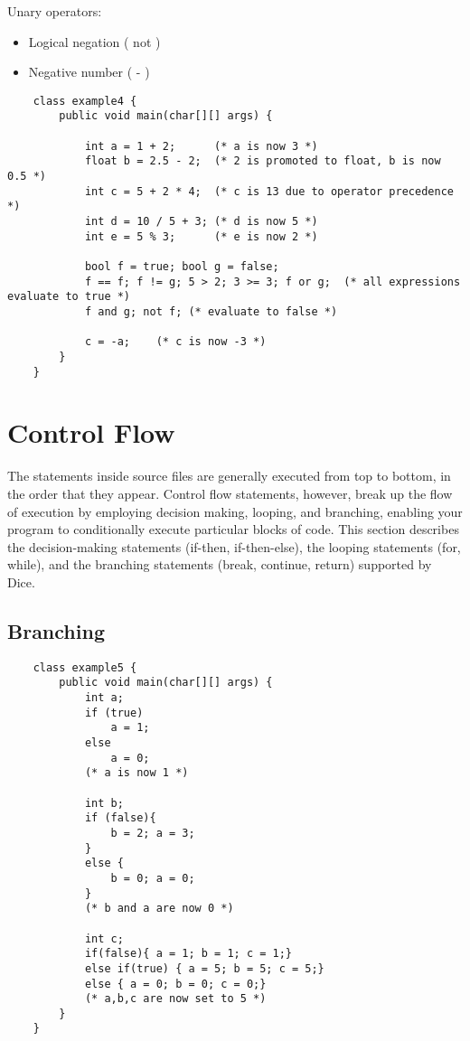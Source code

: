 \begin{homeworkProblem}
	Unary operators:
	\begin{itemize}
		\item Logical negation ( not )
		\item Negative number ( - )
	\end{itemize}

	\begin{verbatim}
	class example4 {
		public void main(char[][] args) {

			int a = 1 + 2;      (* a is now 3 *)
			float b = 2.5 - 2;  (* 2 is promoted to float, b is now 0.5 *)
			int c = 5 + 2 * 4;  (* c is 13 due to operator precedence *)
			int d = 10 / 5 + 3; (* d is now 5 *)
			int e = 5 % 3; 	    (* e is now 2 *)

			bool f = true; bool g = false; 
			f == f; f != g; 5 > 2; 3 >= 3; f or g;  (* all expressions evaluate to true *)
			f and g; not f; (* evaluate to false *)

			c = -a;    (* c is now -3 *)
		}
	}
	\end{verbatim}

	\section{Control Flow}
	The statements inside source files are generally executed from top to bottom, in the order that they appear. Control flow statements, however, break up the flow of execution by employing decision making, looping, and branching, enabling your program to conditionally execute particular blocks of code. This section describes the decision-making statements (if-then, if-then-else), the looping statements (for, while), and the branching statements (break, continue, return) supported by Dice.
	\subsection{Branching}
	\begin{verbatim}
	class example5 {
		public void main(char[][] args) {
			int a;
			if (true)
				a = 1;
			else
				a = 0;
			(* a is now 1 *)

			int b;
			if (false){ 
				b = 2; a = 3; 
			}
			else {
				b = 0; a = 0; 
			}
			(* b and a are now 0 *)

			int c;
			if(false){ a = 1; b = 1; c = 1;}
			else if(true) { a = 5; b = 5; c = 5;}
			else { a = 0; b = 0; c = 0;}
			(* a,b,c are now set to 5 *)
		}
	}
	\end{verbatim}

\end{homeworkProblem}
